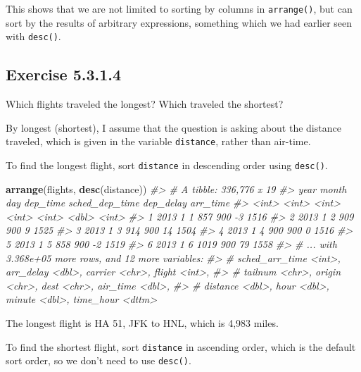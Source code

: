 \documentclass[]{book}
\newenvironment{Shaded}{\begin{snugshade}}{\end{snugshade}}
\newcommand{\CommentTok}[1]{\textcolor[rgb]{0.56,0.35,0.01}{\textit{#1}}}
\newcommand{\KeywordTok}[1]{\textcolor[rgb]{0.13,0.29,0.53}{\textbf{#1}}}
\newcommand{\NormalTok}[1]{#1}
\theoremstyle{plain}
\theoremstyle{remark}
\begin{document}
This shows that we are not limited to sorting by columns in \texttt{arrange()}, but
can sort by the results of arbitrary expressions, something which we had
earlier seen with \texttt{desc()}.

\hypertarget{exercise-5.3.1.4}{%
\subsection*{\texorpdfstring{Exercise {5.3.1.4}}{Exercise 5.3.1.4}}\label{exercise-5.3.1.4}}

Which flights traveled the longest? Which traveled the shortest?

By longest (shortest), I assume that the question is asking about the distance traveled, which is given in the variable \texttt{distance}, rather than air-time.

To find the longest flight, sort \texttt{distance} in descending order using \texttt{desc()}.

\begin{Shaded}
\begin{Highlighting}[]
\KeywordTok{arrange}\NormalTok{(flights, }\KeywordTok{desc}\NormalTok{(distance))}
\CommentTok{#> # A tibble: 336,776 x 19}
\CommentTok{#>    year month   day dep_time sched_dep_time dep_delay arr_time}
\CommentTok{#>   <int> <int> <int>    <int>          <int>     <dbl>    <int>}
\CommentTok{#> 1  2013     1     1      857            900        -3     1516}
\CommentTok{#> 2  2013     1     2      909            900         9     1525}
\CommentTok{#> 3  2013     1     3      914            900        14     1504}
\CommentTok{#> 4  2013     1     4      900            900         0     1516}
\CommentTok{#> 5  2013     1     5      858            900        -2     1519}
\CommentTok{#> 6  2013     1     6     1019            900        79     1558}
\CommentTok{#> # ... with 3.368e+05 more rows, and 12 more variables:}
\CommentTok{#> #   sched_arr_time <int>, arr_delay <dbl>, carrier <chr>, flight <int>,}
\CommentTok{#> #   tailnum <chr>, origin <chr>, dest <chr>, air_time <dbl>,}
\CommentTok{#> #   distance <dbl>, hour <dbl>, minute <dbl>, time_hour <dttm>}
\end{Highlighting}
\end{Shaded}

The longest flight is HA 51, JFK to HNL, which is 4,983 miles.

To find the shortest flight, sort \texttt{distance} in ascending order, which is the default sort order, so we don't need to use \texttt{desc()}.
\end{document}
